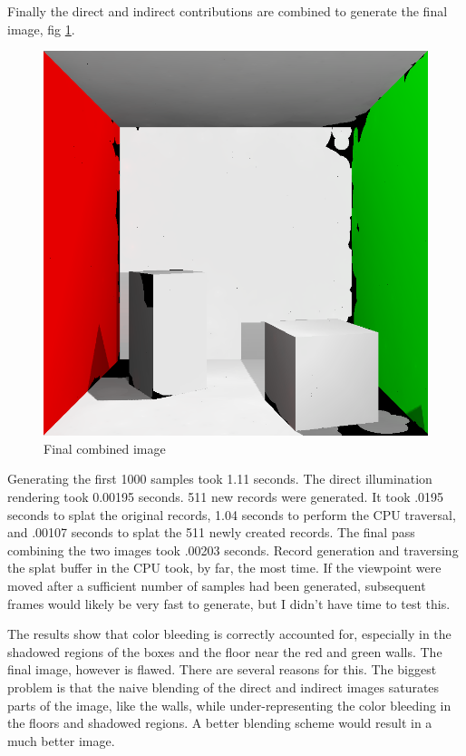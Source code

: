 \documentclass[10pt,twopage]{acmsiggraph}
\begin{document}
Finally the direct and indirect contributions are combined to generate the final image, fig \ref{final}.

\begin{figure}[htbp]
\begin{center}
\includegraphics[scale = .3]{finalResult.png}
\caption{Final combined image}
\label{final}
\end{center}
\end{figure}

Generating the first 1000 samples took 1.11 seconds.  The direct illumination rendering took 0.00195 seconds.  511 new records were generated.  It took .0195 seconds to splat the original records, 1.04 seconds to perform the CPU traversal, and .00107 seconds to splat the 511 newly created records.  The final pass combining the two images took .00203 seconds.  Record generation and traversing the splat buffer in the CPU took, by far, the most time.  If the viewpoint were moved after a sufficient number of samples had been generated, subsequent frames would likely be very fast to generate, but I didn't have time to test this.

The results show that color bleeding is correctly accounted for, especially in the shadowed regions of the boxes and the floor near the red and green walls.  The final image, however is flawed.  There are several reasons for this.  The biggest problem is that the naive blending of the direct and indirect images saturates parts of the image, like the walls, while under-representing the color bleeding in the floors and shadowed regions.  A better blending scheme would result in a much better image.
\end{document}

